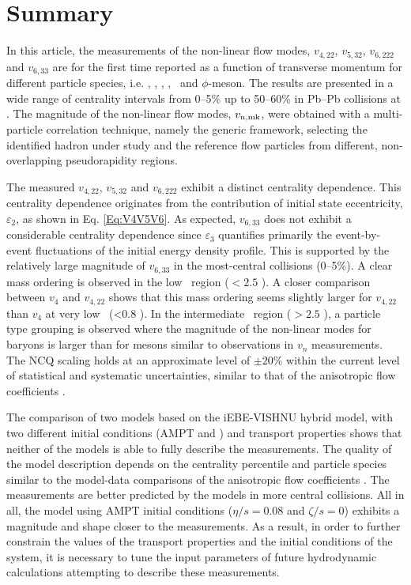 \newpage

\section{Summary}
\label{Sec:conclusion}

In this article, the measurements of the non-linear flow modes, $v_{4,22}$, $v_{5,32}$, $v_{6,222}$ and $v_{6,33}$ are for the first time reported as a function of transverse momentum for different particle species, i.e. \pion, \kaon, \Ks, \proton, \lambdas~and $\phi$-meson. The results are presented in a wide range of centrality intervals from 0--5\% up to 50--60\% in Pb--Pb collisions at \sNN. The magnitude of the non-linear flow modes, $v_{\rm n,mk}$, were obtained with a multi-particle correlation technique, namely the generic framework, selecting the identified hadron under study and the reference flow particles from different, non-overlapping pseudorapidity regions.  

The measured $v_{4,22}$, $v_{5,32}$ and $v_{6,222}$ exhibit a distinct centrality dependence. This centrality dependence originates from the contribution of initial state eccentricity, $\varepsilon_{2}$, as shown in Eq. \ref{Eq:V4V5V6}. As expected, $v_{6,33}$ does not exhibit a considerable centrality dependence since $\varepsilon_{3}$ quantifies primarily the event-by-event fluctuations of the initial energy density profile. This is supported by the relatively large magnitude of $v_{6,33}$ in the most-central collisions (0--5\%). A clear mass ordering is observed in the low \pT~region (\pT$< 2.5$ \GeV). A closer comparison between $v_{4}$ and $v_{4,22}$ shows that this mass ordering seems slightly larger for $v_{4,22}$ than $v_{4}$ at very low \pT~(\pT<0.8 \GeV). 
In the intermediate \pT~region (\pT$> 2.5$ \GeV), a particle type grouping is observed where the magnitude of the non-linear modes for baryons is larger than for mesons similar to observations in $v_{n}$ measurements. The NCQ scaling holds at an approximate level of $\pm 20$\% within the current level of statistical and systematic uncertainties, similar to that of the anisotropic flow coefficients \cite{Acharya:2018zuq}. 

The comparison of two models based on the iEBE-VISHNU hybrid model, with two different initial conditions (AMPT and \trento) and transport properties shows that neither of the models is able to fully describe the measurements. The quality of the model description depends on the centrality percentile and particle species similar to the model-data comparisons of the anisotropic flow coefficients \cite{Acharya:2018zuq}. The measurements are better predicted by the models in more central collisions. All in all, the model using AMPT initial conditions ($\eta/s = 0.08$ and $\zeta/s =0$) exhibits a magnitude and shape closer to the measurements. As a result, in order to further constrain the values of the transport properties and the initial conditions of the system, it is necessary to tune the input parameters of future hydrodynamic calculations attempting to describe these measurements.